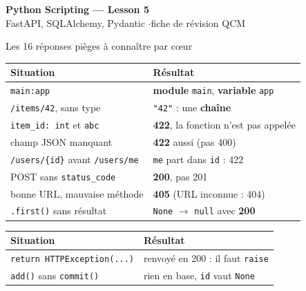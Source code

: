 \documentclass[a4paper,10pt]{article}
\newcommand{\co}[1]{\texttt{\textcolor{codefg}{#1}}}
\begin{document}

\small

\begin{center}
  {\LARGE\bfseries\color{accent} Python Scripting --- Lesson 5}\\[0.3em]
  {\normalsize FastAPI, SQLAlchemy, Pydantic \quad$\cdot$\quad fiche de révision QCM}
\end{center}
\vspace{0.4em}

\begin{piegebox}{Les 16 réponses pièges à connaître par c\oe ur}
\begin{minipage}[t]{0.485\linewidth}
\begin{tabularx}{\linewidth}{@{}l>{\raggedright\arraybackslash}X@{}}
\toprule
\textbf{Situation} & \textbf{Résultat} \\
\midrule
\co{main:app}                 & \textbf{module} \co{main}, \textbf{variable} \co{app} \\
\co{/items/42}, sans type     & \co{"42"} : une \textbf{chaîne} \\
\co{item\_id: int} et \co{abc}& \textbf{422}, la fonction n'est pas appelée \\
champ JSON manquant           & \textbf{422} aussi (pas 400) \\
\co{/users/\{id\}} avant \co{/users/me} & \co{me} part dans \co{id} : 422 \\
POST sans \co{status\_code}   & \textbf{200}, pas 201 \\
bonne URL, mauvaise méthode   & \textbf{405} (URL inconnue : 404) \\
\co{.first()} sans résultat   & \co{None} $\to$ \co{null} avec \textbf{200} \\
\bottomrule
\end{tabularx}
\end{minipage}\hfill
\begin{minipage}[t]{0.485\linewidth}
\begin{tabularx}{\linewidth}{@{}l>{\raggedright\arraybackslash}X@{}}
\toprule
\textbf{Situation} & \textbf{Résultat} \\
\midrule
\co{return HTTPException(...)} & renvoyé en 200 : il faut \co{raise} \\
\co{add()} sans \co{commit()}  & rien en base, \co{id} vaut \co{None} \\

\end{tabularx}
\end{minipage}
\end{piegebox}
\end{document}
